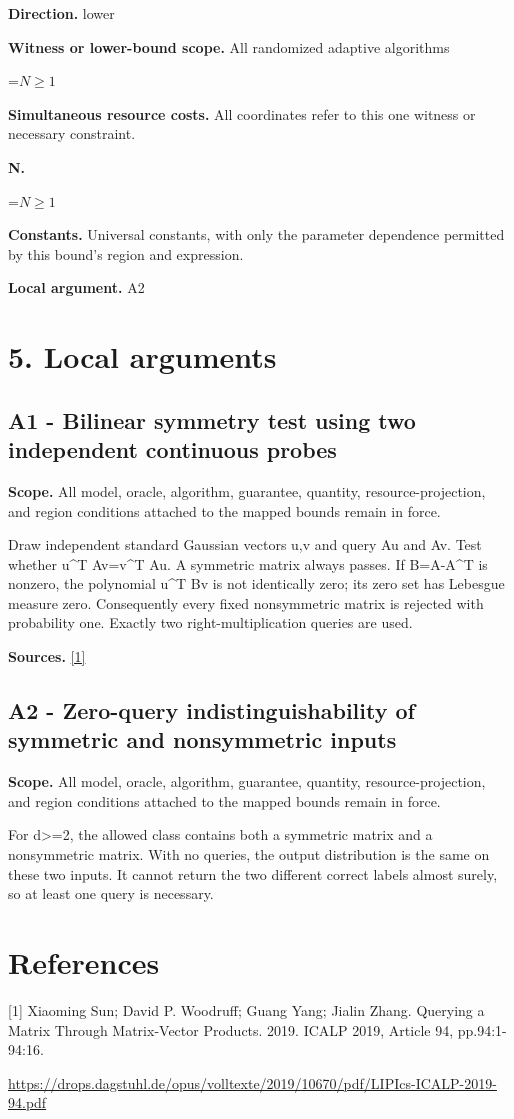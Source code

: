 \documentclass[10pt,a4paper]{article}
\newcommand{\AtlasMath}[1]{\par\begingroup\centering\setbox0=\hbox{$\displaystyle #1$}\ifdim\wd0>1.4\linewidth\typeout{ATLAS WIDE FORMULA: \the\wd0}\fi\ifdim\wd0>\linewidth\resizebox{\linewidth}{!}{\box0}\else\box0\fi\par\endgroup}
\begin{document}
\textbf{Direction.} lower

\textbf{Witness or lower-bound scope.} All randomized adaptive algorithms

\AtlasMath{N\ge 1}
\textbf{Simultaneous resource costs.} All coordinates refer to this one witness or necessary constraint.

\textbf{N.}

\AtlasMath{N\ge 1}
\textbf{Constants.} Universal constants, with only the parameter dependence permitted by this bound’s region and expression.

\textbf{Local argument.} A2

\section{5. Local arguments}
\subsection{A1 - Bilinear symmetry test using two independent continuous probes}
\textbf{Scope.} All model, oracle, algorithm, guarantee, quantity, resource-projection, and region conditions attached to the mapped bounds remain in force.

Draw independent standard Gaussian vectors u,v and query Au and Av. Test whether u\textasciicircum{}T Av=v\textasciicircum{}T Au. A symmetric matrix always passes. If B=A-A\textasciicircum{}T is nonzero, the polynomial u\textasciicircum{}T Bv is not identically zero; its zero set has Lebesgue measure zero. Consequently every fixed nonsymmetric matrix is rejected with probability one. Exactly two right-multiplication queries are used.

\textbf{Sources.} \href{https://drops.dagstuhl.de/opus/volltexte/2019/10670/pdf/LIPIcs-ICALP-2019-94.pdf}{[1]}

\subsection{A2 - Zero-query indistinguishability of symmetric and nonsymmetric inputs}
\textbf{Scope.} All model, oracle, algorithm, guarantee, quantity, resource-projection, and region conditions attached to the mapped bounds remain in force.

For d>=2, the allowed class contains both a symmetric matrix and a nonsymmetric matrix. With no queries, the output distribution is the same on these two inputs. It cannot return the two different correct labels almost surely, so at least one query is necessary.

\section{References}
[1] Xiaoming Sun; David P. Woodruff; Guang Yang; Jialin Zhang. Querying a Matrix Through Matrix-Vector Products. 2019. ICALP 2019, Article 94, pp.94:1-94:16.

\url{https://drops.dagstuhl.de/opus/volltexte/2019/10670/pdf/LIPIcs-ICALP-2019-94.pdf}
\end{document}
